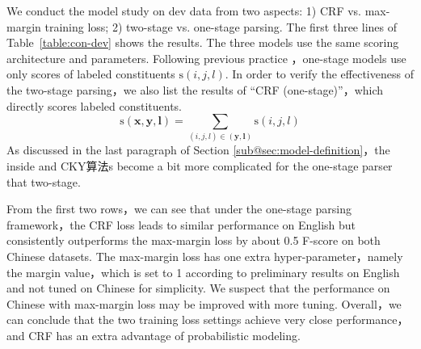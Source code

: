 We conduct the model study on dev data from two aspects: 1) CRF vs. max-margin training loss; 2) two-stage vs. one-stage parsing.
The first three lines of
Table~\ref{table:con-dev} shows the results.
The three models use the same scoring architecture and parameters.
Following previous practice \cite{stern-etal-2017-minimal}，one-stage models use only scores of labeled constituents $\mathrm{s}(i,j,l)$.
In order to verify the effectiveness of the two-stage parsing，we also list the results of ``CRF (one-stage)''，which directly scores labeled constituents.
\begin{equation} \label{eq:tree-label-score}
    \mathrm{s}(\boldsymbol{x},\boldsymbol{y},\boldsymbol{l}) =
    \sum_{(i,j,l) \in (\boldsymbol{y}, \boldsymbol{l})} \mathrm{s}(i,j,l)
\end{equation}
As discussed in the last paragraph of Section \ref{sub@sec:model-definition}，the inside and CKY算法s become a bit more complicated for the one-stage parser that two-stage.

From the first two rows，we can see that
under the one-stage parsing framework，the CRF loss leads to similar performance on English
but consistently outperforms the max-margin loss by about 0.5 F-score on both Chinese datasets.
The max-margin loss has one extra hyper-parameter，namely the margin value，which is set to 1 according to preliminary results on English and not tuned on Chinese for simplicity.
We suspect that the performance on Chinese with max-margin loss may be improved with more tuning.
Overall，we can conclude that the two training loss settings achieve very close performance，and CRF has an extra advantage of probabilistic modeling.

